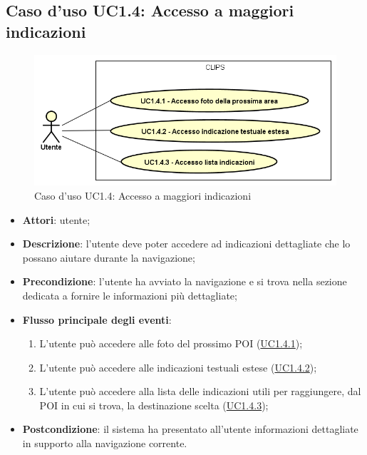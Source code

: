 \documentclass[../AnalisiDeiRequisiti.tex]{subfiles}
\begin{document}
\subsection{Caso d'uso UC1.4: Accesso a maggiori indicazioni}

        \begin{figure}[H]
            \centering
            \includegraphics[scale=0.95, width=\textwidth]{img/UC1-4.png}
            \caption{Caso d'uso UC1.4: Accesso a maggiori indicazioni}\label{fig:UC1.4} 
        \end{figure}
\begin{itemize}
\item \textbf{Attori}: utente;
\item \textbf{Descrizione}: l'utente deve poter accedere ad indicazioni dettagliate che lo possano aiutare durante la navigazione; 
      \item \textbf{Precondizione}: l'utente ha avviato la navigazione e si trova nella sezione dedicata a fornire le informazioni più dettagliate;

        \item \textbf{Flusso principale degli eventi}:
          \begin{enumerate}
          \item L'utente può accedere alle foto del prossimo POI (\hyperlink{UC1.4.1}{UC1.4.1});
          \item L'utente può accedere alle indicazioni testuali estese (\hyperlink{UC1.4.2}{UC1.4.2});
          \item L'utente può accedere alla lista delle indicazioni utili per raggiungere, dal POI in cui si trova, la destinazione scelta (\hyperlink{UC1.4.3}{UC1.4.3});

      \end{enumerate}
    \item \textbf{Postcondizione}: il sistema ha presentato all'utente informazioni dettagliate in supporto alla navigazione corrente.
  \end{itemize}
\hypertarget{UC1.4.1}{}
\end{document}
